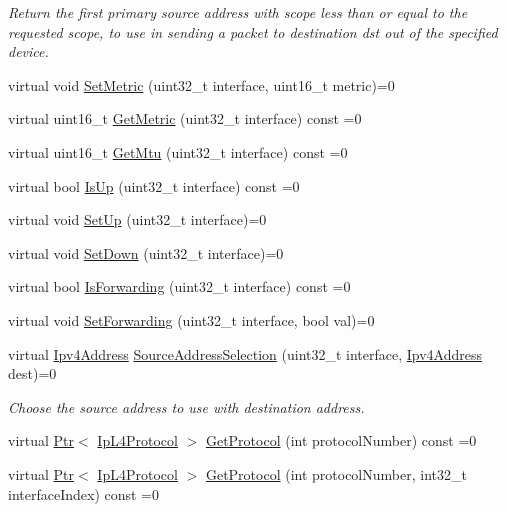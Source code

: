 \begin{DoxyCompactItemize}
\begin{DoxyCompactList}\small\item\em Return the first primary source address with scope less than or equal to the requested scope, to use in sending a packet to destination dst out of the specified device. \end{DoxyCompactList}\item 
virtual void \hyperlink{classns3_1_1Ipv4_a2b5632573b67957fabe2dfea248a57a3}{Set\+Metric} (uint32\+\_\+t interface, uint16\+\_\+t metric)=0
\item 
virtual uint16\+\_\+t \hyperlink{classns3_1_1Ipv4_ace48f3304b9da2e15cda01fc8c11efd9}{Get\+Metric} (uint32\+\_\+t interface) const =0
\item 
virtual uint16\+\_\+t \hyperlink{classns3_1_1Ipv4_a58545a760ba30f653d2be2adaed0651c}{Get\+Mtu} (uint32\+\_\+t interface) const =0
\item 
virtual bool \hyperlink{classns3_1_1Ipv4_af5cc0afb0373b1c3c2014c974aa269ba}{Is\+Up} (uint32\+\_\+t interface) const =0
\item 
virtual void \hyperlink{classns3_1_1Ipv4_a71b2f8acca4923aef907b50b3196bf23}{Set\+Up} (uint32\+\_\+t interface)=0
\item 
virtual void \hyperlink{classns3_1_1Ipv4_ac148839884b1ce11f9237ddc523f5cd2}{Set\+Down} (uint32\+\_\+t interface)=0
\item 
virtual bool \hyperlink{classns3_1_1Ipv4_a241bb02749cefd690671a4cbc52a8dae}{Is\+Forwarding} (uint32\+\_\+t interface) const =0
\item 
virtual void \hyperlink{classns3_1_1Ipv4_aee95b3b96994698f5629f8b9e617b587}{Set\+Forwarding} (uint32\+\_\+t interface, bool val)=0
\item 
virtual \hyperlink{classns3_1_1Ipv4Address}{Ipv4\+Address} \hyperlink{classns3_1_1Ipv4_ac7a49d14371de95cd1cc8f6563266edd}{Source\+Address\+Selection} (uint32\+\_\+t interface, \hyperlink{classns3_1_1Ipv4Address}{Ipv4\+Address} dest)=0
\begin{DoxyCompactList}\small\item\em Choose the source address to use with destination address. \end{DoxyCompactList}\item 
virtual \hyperlink{classns3_1_1Ptr}{Ptr}$<$ \hyperlink{classns3_1_1IpL4Protocol}{Ip\+L4\+Protocol} $>$ \hyperlink{classns3_1_1Ipv4_acc65667e029c46ec184685674933d956}{Get\+Protocol} (int protocol\+Number) const =0
\item 
virtual \hyperlink{classns3_1_1Ptr}{Ptr}$<$ \hyperlink{classns3_1_1IpL4Protocol}{Ip\+L4\+Protocol} $>$ \hyperlink{classns3_1_1Ipv4_a15733f7419f27fb3bee959b1ee256d30}{Get\+Protocol} (int protocol\+Number, int32\+\_\+t interface\+Index) const =0

\end{DoxyCompactItemize}
